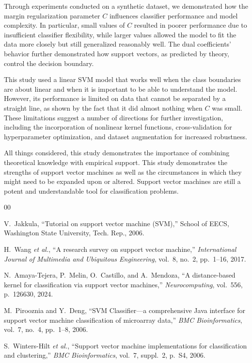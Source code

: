 \documentclass[conference]{IEEEtran}
\begin{document}
	Through experiments conducted on a synthetic dataset, we demonstrated how the margin regularization parameter $C$ influences classifier performance and model complexity. In particular, small values of $C$ resulted in poorer performance due to insufficient classifier flexibility, while larger values allowed the model to fit the data more closely but still generalized reasonably well. The dual coefficients' behavior further demonstrated how support vectors, as predicted by theory, control the decision boundary.
	
	This study used a linear SVM model that works well when the class boundaries are about linear and when it is important to be able to understand the model. However, its performance is limited on data that cannot be separated by a straight line, as shown by the fact that it did almost nothing when $C$ was small. These limitations suggest a number of directions for further investigation, including the incorporation of nonlinear kernel functions, cross-validation for hyperparameter optimization, and dataset augmentation for increased robustness.
	
	All things considered, this study demonstrates the importance of combining theoretical knowledge with empirical support. This study demonstrates the strengths of support vector machines as well as the circumstances in which they might need to be expanded upon or altered. Support vector machines are still a potent and understandable tool for classification problems.
	
	\begin{thebibliography}{00}
		
		V.~Jakkula, ``Tutorial on support vector machine (SVM),'' School of EECS,
		Washington State University, Tech. Rep., 2006.
		
		H.~Wang \textit{et al.}, ``A research survey on support vector machine,''
		\textit{International Journal of Multimedia and Ubiquitous Engineering},
		vol.~8, no.~2, pp.~1--16, 2017.
		
		N.~Amaya-Tejera, P.~Melin, O.~Castillo, and A.~Mendoza, ``A distance-based
		kernel for classification via support vector machines,'' \textit{Neurocomputing},
		vol.~556, p.~126630, 2024.
		
		M.~Pirooznia and Y.~Deng, ``SVM Classifier---a comprehensive Java interface
		for support vector machine classification of microarray data,''
		\textit{BMC Bioinformatics}, vol.~7, no.~4, pp.~1--8, 2006.
		
		S.~Winters-Hilt \textit{et al.}, ``Support vector machine implementations for
		classification and clustering,'' \textit{BMC Bioinformatics}, vol.~7, suppl.~2,
		p.~S4, 2006.
		
	\end{thebibliography}
	
\end{document}
